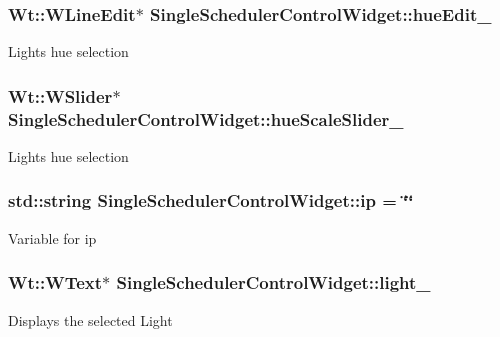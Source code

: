 \subsubsection[{\texorpdfstring{hue\+Edit\+\_\+}{hueEdit_}}]{\setlength{\rightskip}{0pt plus 5cm}Wt\+::\+W\+Line\+Edit$\ast$ Single\+Scheduler\+Control\+Widget\+::hue\+Edit\+\_\+\hspace{0.3cm}{\ttfamily [private]}}\hypertarget{classSingleSchedulerControlWidget_ac184a13b1ff7561a7e2e5f790dc42bd3}{}\label{classSingleSchedulerControlWidget_ac184a13b1ff7561a7e2e5f790dc42bd3}
Light\textquotesingle{}s hue selection 
\subsubsection[{\texorpdfstring{hue\+Scale\+Slider\+\_\+}{hueScaleSlider_}}]{\setlength{\rightskip}{0pt plus 5cm}Wt\+::\+W\+Slider$\ast$ Single\+Scheduler\+Control\+Widget\+::hue\+Scale\+Slider\+\_\+\hspace{0.3cm}{\ttfamily [private]}}\hypertarget{classSingleSchedulerControlWidget_af8f29e2d94ac91c19f7b44ac947f7f7d}{}\label{classSingleSchedulerControlWidget_af8f29e2d94ac91c19f7b44ac947f7f7d}
Light\textquotesingle{}s hue selection 
\subsubsection[{\texorpdfstring{ip}{ip}}]{\setlength{\rightskip}{0pt plus 5cm}std\+::string Single\+Scheduler\+Control\+Widget\+::ip = \char`\"{}\char`\"{}\hspace{0.3cm}{\ttfamily [private]}}\hypertarget{classSingleSchedulerControlWidget_a218706e43a5777961386c8bdee383192}{}\label{classSingleSchedulerControlWidget_a218706e43a5777961386c8bdee383192}
Variable for ip 
\subsubsection[{\texorpdfstring{light\+\_\+}{light_}}]{\setlength{\rightskip}{0pt plus 5cm}Wt\+::\+W\+Text$\ast$ Single\+Scheduler\+Control\+Widget\+::light\+\_\+\hspace{0.3cm}{\ttfamily [private]}}\hypertarget{classSingleSchedulerControlWidget_a91f77910545268fdd89df0f9903dbb1a}{}\label{classSingleSchedulerControlWidget_a91f77910545268fdd89df0f9903dbb1a}
Displays the selected Light 
